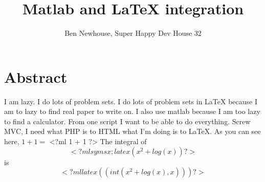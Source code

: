 \documentclass{article}
\title{Matlab and LaTeX integration}
\author{Ben Newhouse, Super Happy Dev House 32}
\begin{document}
\maketitle
\section{Abstract}
I am lazy.  I do lots of problem sets.  I do lots of problem sets in LaTeX because I am to lazy to find real paper to write on.  I also use matlab because I am too lazy to find a calculator.  From one script I want to be able to do everything.  Screw MVC, I need what PHP is to HTML what I'm doing is to LaTeX.
As you can see here, $1 + 1=$
<?ml
1 + 1
?>
The integral of
\begin{displaymath}
<?ml
syms x;
latex(x^2 + log(x))
?>
\end{displaymath}
is
\begin{displaymath}
<?ml
latex((int(x^2 + log(x),x)))
?>
\end{displaymath}
\end{document}
